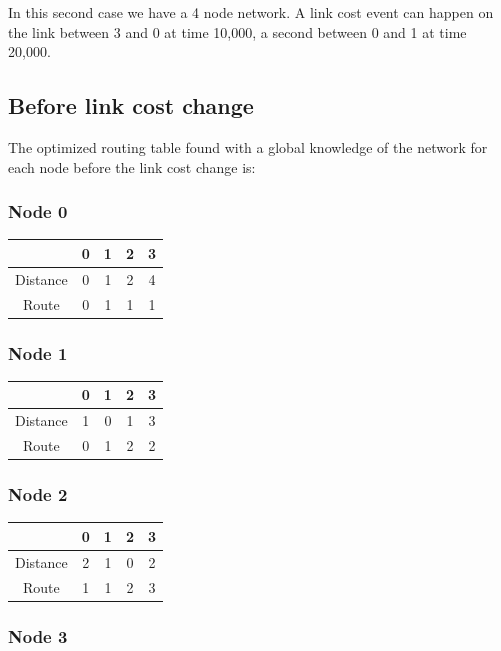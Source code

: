 \documentclass[a4paper,11pt,final]{report}
\begin{document}
In this second case we have a 4 node network. A link cost event can
happen on the link between 3 and 0 at time 10,000, a second between 0
and 1 at time 20,000.

\subsection{Before link cost change}

The optimized routing table found with a global knowledge of the network
for each node before the link cost change is:

\subsubsection{Node 0}

\begin{tabular}{|c|c|c|c|c|}
\hline
& 0 & 1 & 2 & 3 \\ \hline
Distance & 0 & 1 & 2 & 4 \\ \hline
Route & 0 & 1 & 1 & 1 \\ \hline
\end{tabular}

\subsubsection{Node 1}

\begin{tabular}{|c|c|c|c|c|}
\hline
& 0 & 1 & 2 & 3 \\ \hline
Distance & 1 & 0 & 1 & 3 \\ \hline
Route & 0 & 1 & 2 & 2 \\ \hline
\end{tabular}

\subsubsection{Node 2}

\begin{tabular}{|c|c|c|c|c|}
\hline
& 0 & 1 & 2 & 3 \\ \hline
Distance & 2 & 1 & 0 & 2 \\ \hline
Route & 1 & 1 & 2 & 3 \\ \hline
\end{tabular}

\subsubsection{Node 3}
\end{document}
